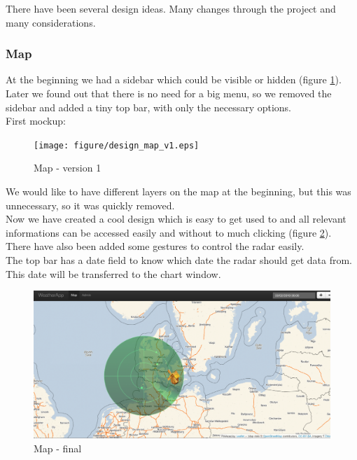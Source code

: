 There have been several design ideas. Many changes through the project and many considerations.

\subsubsection{Map}
At the beginning we had a sidebar which could be visible or hidden (figure \ref{fig:map_v1}). Later we found out that there is no need for a big menu, so we removed the sidebar and added a tiny top bar, with only the necessary options.\\
First mockup:
\begin{figure}[htbp]
   \centering
   \texttt{[image: figure/design\_map\_v1.eps]}
   \caption{Map - version 1}
   \label{fig:map_v1}
\end{figure}

We would like to have different layers on the map at the beginning, but this was unnecessary, so it was quickly removed.\\
Now we have created a cool design which is easy to get used to and all relevant informations can be accessed easily and without to much clicking (figure \ref{fig:map_final}).
There have also been added some gestures to control the radar easily.\\
The top bar has a date field to know which date the radar should get data from. This date will be transferred to the chart window.

\begin{figure}[htbp]
   \centering
   \includegraphics[width=1\linewidth]{figure/design_map_final.eps}
   \caption{Map - final}
   \label{fig:map_final}
\end{figure}

